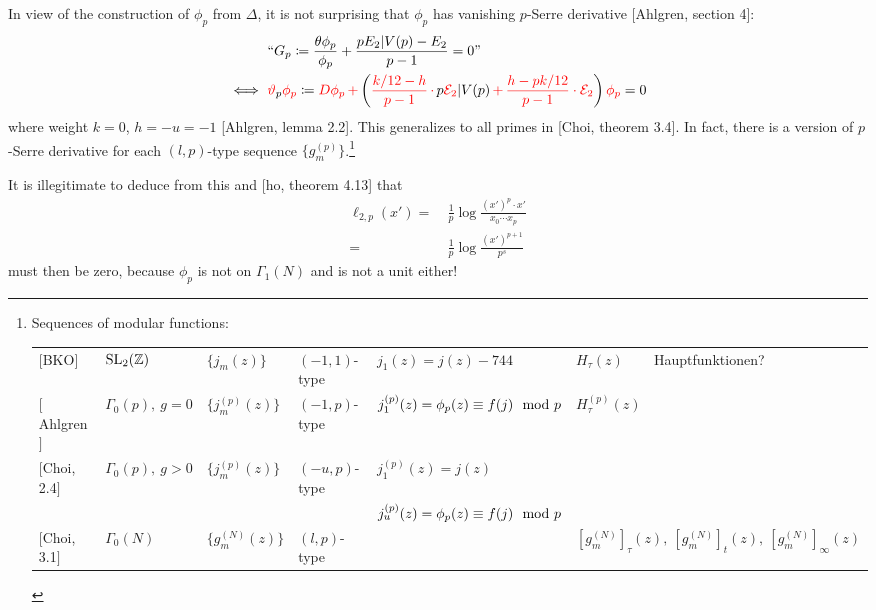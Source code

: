 \documentclass{rs}
\theoremstyle{definition}
\theoremstyle{remark}
\newcommand{\mb}[1]{\mathbb{#1}}
\newcommand{\CE}{{\cal E}}
\newcommand{\BZ}{{\mb Z}}
\newcommand{\md}{~~{\rm mod}~}
\renewcommand{\D}{\Delta}
\newcommand{\G}{\Gamma}
\newcommand{\ce}{\coloneqq}
\renewcommand{\=}{\approx}
\renewcommand{\-}{\sim}
\newcommand{\rd}[1]{\textcolor{red}{#1}}
\newcommand{\SL}{{\rm SL}}
\numberwithin{equation}{section}
\numberwithin{thm}{section}
\begin{document}
In view of the construction of $\phi_p$ from $\D$, 
it is not surprising that $\phi_p$ has vanishing $p$-Serre derivative [Ahlgren, section 4]: 
\begin{equation*}
 \begin{split}
       & ~ \text{``$G_p \ce \frac{\theta \phi_p}{\phi_p} + \frac{p E_2 | V(p) - E_2}{p - 1} = 0$''} \\
  \iff & ~ \rd{\vartheta}_p \rd{\phi_p} \ce \rd{D\phi_p \, +} \left( \rd{\frac{k / 12 - h}{p - 1} \, \cdot \,} p \rd{\CE_2} | V(p) 
           \rd{\, + \, \frac{h - p k / 12}{p - 1} \cdot \CE_2} \right) \rd{\phi_p} = 0 
 \end{split}
\end{equation*}
where weight $k = 0$, $h = -u = -1$ [Ahlgren, lemma 2.2].  
This generalizes to all primes in [Choi, theorem 3.4].  
In fact, there is a version of $p$-Serre derivative for each $(l,p)$-type sequence $\{g_m^{(p)}\}$.\footnote{Sequences of modular functions: 
\begin{center}
 \begin{tabular}{llllll}
  $[$BKO$]$       & $\SL_2(\BZ)$       & $\{j_m(z)\}$       & $(-1,1)$-type & $j_1(z) = j(z) - 744$                        & $H_\tau(z)$ ~~~ Hauptfunktionen?  \\
  $[$Ahlgren$]$   & $\G_0(p), ~ g = 0$ & $\{j_m^{(p)}(z)\}$ & $(-1,p)$-type & $j_1^{(p)}(z) = \phi_p(z) \equiv f(j) \md p$ & $H_\tau^{(p)}(z)$ \\
  $[$Choi, 2.4$]$ & $\G_0(p), ~ g > 0$ & $\{j_m^{(p)}(z)\}$ & $(-u,p)$-type & $j_1^{(p)}(z) = j(z)$                        & \\
                  &                    &                    &               & $j_u^{(p)}(z) = \phi_p(z) \equiv f(j) \md p$ & \\
  $[$Choi, 3.1$]$ & $\G_0(N)$          & $\{g_m^{(N)}(z)\}$ & $(l,p)$-type  &                                              & $[g_m^{(N)}]_\tau(z), ~ [g_m^{(N)}]_t(z), ~ [g_m^{(N)}]_\infty(z)$ 
 \end{tabular}
\end{center}
}

It is illegitimate to deduce from this and [ho, theorem 4.13] that 
\begin{equation*}
 \begin{split}
  \ell_{2,p}(x') = & ~ \frac{1}{p} \log \frac{(x')^p \cdot x'}{x_0 \cdots x_p} \\
                 = & ~ \frac{1}{p} \log \frac{(x')^{p + 1}}{p^s} 
 \end{split}
\end{equation*}
must then be zero, because $\phi_p$ is not on $\G_1(N)$ and is not a unit either!  
\end{document}
